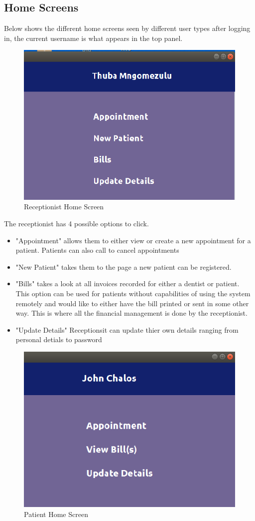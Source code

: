 \documentclass[11 pt]{article}
\begin{document}
    \subsection{Home Screens}
    Below shows the different home screens seen by different user types after logging in, the current username is what appears in the top panel.
    \begin{figure}[h]
    \centering
    \includegraphics[width=.7\linewidth]{receptionist_home.png}
    \caption{Receptionist Home Screen}
    \label{fig:ERD}
    \end{figure}
The receptionist has 4 possible options to click.
\begin{itemize}
\item
"Appointment" allows them to either view or create a new appointment for a patient. Patients can also call to cancel appointments
\item
"New Patient" takes them to the page a new patient can be registered.
\item
"Bills" takes a look at all invoices recorded for either a dentist or patient. This option can be used for patients without capabilities of using the system remotely and would like to either have the bill printed or sent in some other way. This is where all the financial management is done by the receptionist.
\item
"Update Details" Receptionsit can update thier own details ranging from personal detials to password
\end{itemize}  
    \begin{figure}[h]
    \centering
    \includegraphics[width=.7\linewidth]{patient_home.png}
    \caption{Patient Home Screen}
    \label{fig:ERD}
    \end{figure}
\end{document}
